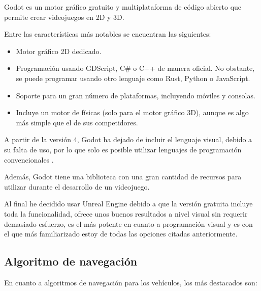 \documentclass[a4paper,11pt]{book}
\begin{document}
Godot \cite{godot} es un motor gráfico gratuito y multiplataforma de código abierto que permite crear videojuegos en 2D y 3D. 
   
Entre las características más notables se encuentran las siguientes:

\begin{itemize}
   \item Motor gráfico 2D dedicado. 
   \item Programación usando GDScript, C\# o C++ de manera oficial. No obstante, se puede programar usando otro lenguaje como Rust, Python o JavaScript. 
   \item Soporte para un gran número de plataformas, incluyendo móviles y consolas.
   \item Incluye un motor de físicas (solo para el motor gráfico 3D), aunque es algo más simple que el de sus competidores.
\end{itemize}

\bigskip 

A partir de la versión 4, Godot ha dejado de incluir el lenguaje visual, debido a su falta de uso, por lo que solo es posible utilizar lenguajes de programación convencionales \cite{godot-no-visual}.

\bigskip

Además, Godot tiene una biblioteca con una gran cantidad de recursos para utilizar durante el desarrollo de un videojuego.


\bigskip

Al final he decidido usar Unreal Engine debido a que la versión gratuita incluye toda la funcionalidad, ofrece unos buenos resultados a nivel visual sin requerir demasiado esfuerzo, es el más potente en cuanto a programación visual y es con el que más familiarizado estoy de todas las opciones citadas anteriormente.

\subsection{Algoritmo de navegación}
En cuanto a algoritmos de navegación para los vehículos, los más destacados son:
\end{document}
